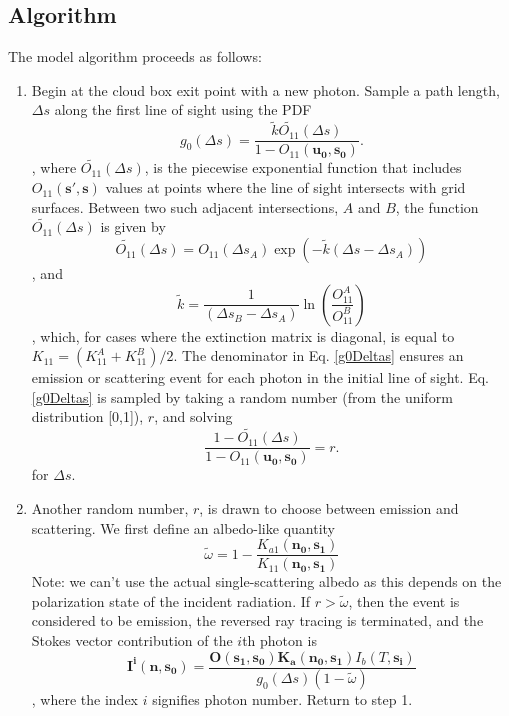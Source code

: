 \subsection{Algorithm}
 \label{sec:montecarlo:alg}
The model algorithm proceeds as follows:

\begin{enumerate}
\item
Begin at the cloud box exit point with a new photon. Sample a
  path length, $\Delta s$ along the first line of sight using the PDF
\begin{equation}
g_0(\Delta s)=\frac{\tilde{k}\tilde{O_{11}}(\Delta s)}
{1-O_{11}(\mathbf{u_0,s_0})}.
\label{g0Deltas}
\end{equation}
, where $\tilde{O_{11}}(\Delta s)$, is the piecewise exponential
function that includes $O_{11}(\mathbf{s',s})$ values at points
where the line of sight intersects with grid surfaces.
Between two such adjacent intersections, $A$ and $B$, the function
$\tilde{O_{11}}(\Delta s)$ is given by
\begin{equation}
\tilde{O_{11}}(\Delta s)=O_{11}(\Delta s_A)\exp\left(-\tilde{k}\left(\Delta s-\Delta
s_A\right)\right)
\label{O11}
\end{equation}
, and
\begin{equation}
\tilde{k}=\frac{1}{\left(\Delta s_B-\Delta s_A\right)}
\ln\left(\frac{O_{11}^A}{O_{11}^B}\right)
\end{equation}
, which, for cases where the extinction matrix is diagonal, is equal to $K_{11}=(K_{11}^A+K_{11}^B)/2$.
The denominator in Eq. \ref{g0Deltas} ensures an emission or scattering
event for each photon in the initial line of sight.
Eq. \ref{g0Deltas} is sampled by taking a random number (from the
uniform distribution [0,1]), $r$, and solving 
\begin{equation}
\frac{1-\tilde{O_{11}}(\Delta s)}{1-O_{11}(\mathbf{u_0,s_0})}=r.
\end{equation}
for $\Delta s$.
\item
Another random number, $r$, is drawn to choose between emission and scattering.  We first define an albedo-like quantity
\begin{equation}
\tilde{\omega}=1-\frac{K_{a1}(\mathbf{n_{0},s_{1}})}{K_{11}(\mathbf{n_{0},s_{1}})}
\end{equation}
Note: we can't use the actual single-scattering albedo as this depends
on the polarization state of the incident radiation.  If $r>\tilde{\omega}$, then the event is considered to be emission,
the reversed ray tracing is terminated, and the Stokes vector
contribution of the $i$th photon is
\begin{equation}
\mathbf{I^i(n,s_0)}=\frac{\mathbf{O(s_1,s_0)}\mathbf{K_a(n_0,s_1)}
  I_b(T,\mathbf{s_i})}{g_0(\Delta s) \left(1-\tilde{\omega}\right)}
\label{Iemission2}
\end{equation}
, where the index $i$ signifies photon number. Return to step 1.


\end{enumerate}
